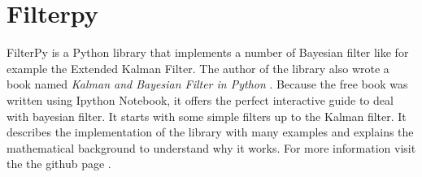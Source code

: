 \section{Filterpy}\label{sec:filterpy}
FilterPy is a Python library that implements a number of Bayesian filter like for example the Extended Kalman Filter. The author of the library also wrote a book named \textit{Kalman and Bayesian Filter in Python} \cite{filterpybook}. Because the free book was written using Ipython Notebook, it offers the perfect interactive guide to deal with bayesian filter. It starts with some simple filters up to the Kalman filter. It describes the implementation of the library with many examples and explains the mathematical background to understand why it works. For more information visit the the github page \cite{filterpygithub}. 